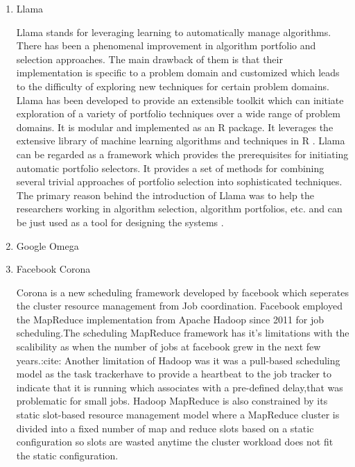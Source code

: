 \begin{enumerate}
\item {} 
Llama

Llama stands for leveraging learning to automatically manage
algorithms. There has been a phenomenal improvement in algorithm
portfolio and selection approaches. The main drawback of them is
that their implementation is specific to a problem domain and
customized which leads to the difficulty of exploring new
techniques for certain problem domains. Llama has been developed
to provide an extensible toolkit which can initiate exploration
of a variety of portfolio techniques over a wide range of problem
domains. It is modular and implemented as an R package. It
leverages the extensive library of machine learning algorithms
and techniques in R \label{\detokenize{i524/technologies:id513}}{\hyperref[\detokenize{i524/technologies:lla1}]{\sphinxcrossref{{[}442{]}}}}. Llama can be regarded as a
framework which provides the prerequisites for initiating
automatic portfolio selectors. It provides a set of methods for
combining several trivial approaches of portfolio selection into
sophisticated techniques. The primary reason behind the
introduction of Llama was to help the researchers working in
algorithm selection, algorithm portfolios, etc. and can be just
used as a tool for designing the systems \label{\detokenize{i524/technologies:id514}}{\hyperref[\detokenize{i524/technologies:lla1}]{\sphinxcrossref{{[}442{]}}}}.

\item {} 
Google Omega

\item {} 
Facebook Corona

Corona is a new scheduling framework developed by facebook which
seperates the cluster resource management from Job coordination.
Facebook employed the MapReduce implementation from Apache Hadoop
since 2011 for job scheduling.The scheduling MapReduce framework
has it's limitations with the scalibility as when the number of
jobs at facebook grew in the next few years.:cite: Another limitation of Hadoop was it was a pull-based
scheduling model as the task trackerhave to provide a heartbeat
to the job tracker to indicate that it is running which
associates with a pre-defined delay,that was problematic for
small jobs. Hadoop MapReduce is also constrained by its static
slot-based resource management model where a MapReduce cluster is
divided into a fixed number of map and reduce slots based on a
static configuration \textendash{} so slots are wasted anytime the cluster
workload does not fit the static configuration.


\end{enumerate}
